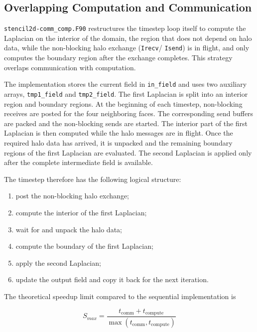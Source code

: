 \documentclass{article}
\begin{document}
\subsection{Overlapping Computation and Communication}
\label{sec:comm-comp}

\texttt{stencil2d-comm\_comp.F90} restructures the timestep loop
itself to compute the Laplacian on
the interior of the domain, the region that does not depend on halo
data, while the non-blocking halo exchange (\texttt{Irecv}/
\texttt{Isend}) is in flight, and only computes the boundary region
after the exchange completes. This strategy overlaps communication with computation.

The implementation stores the current field in \texttt{in\_field} and
uses two auxiliary arrays, \texttt{tmp1\_field} and
\texttt{tmp2\_field}. The first Laplacian is split into an interior
region and boundary regions. At the beginning of each timestep, non-blocking receives are posted for
the four neighboring faces. The corresponding send buffers are packed
and the non-blocking sends are started. The interior part of the first
Laplacian is then computed while the halo messages are in flight. Once
the required halo data has arrived, it is unpacked and the remaining
boundary regions of the first Laplacian are evaluated. The second
Laplacian is applied only after the complete intermediate field is
available.

The timestep therefore has the following logical structure:

\begin{enumerate}
    \item post the non-blocking halo exchange;
    \item compute the interior of the first Laplacian;
    \item wait for and unpack the halo data;
    \item compute the boundary of the first Laplacian;
    \item apply the second Laplacian;
    \item update the output field and copy it back for the next iteration.
\end{enumerate}


The theoretical speedup limit compared to the sequential implementation is

\begin{equation}
    S_{max} = \frac{t_{\text{comm}} + t_{\text{compute}}}{\max(t_{\text{comm}}, t_{\text{compute}})} 
    \label{eq:max-speedup}
\end{equation}
\end{document}
